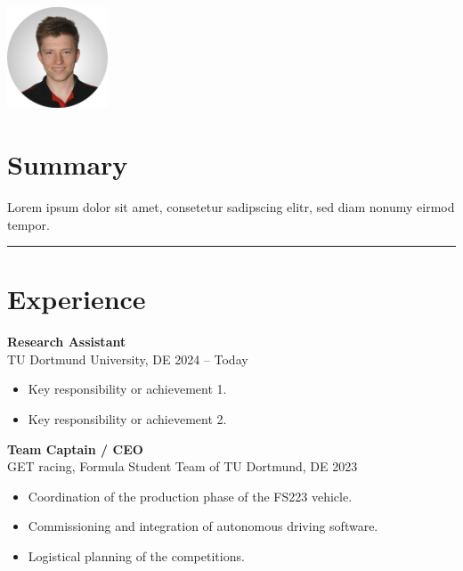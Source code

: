 \documentclass[a4paper,11pt]{article}
\begin{document}
\begin{minipage}[t]{0.3106\textwidth}
    \vspace{-24.62cm}
    \hspace{1.44cm}
    \includegraphics[width=3cm,clip]{profile.png}
\end{minipage}
\hfill
\begin{minipage}[t]{0.65\textwidth}
    \section*{Summary}

    Lorem ipsum dolor sit amet, consetetur sadipscing elitr, sed diam nonumy eirmod tempor.

    \vspace{0.5cm}
    \hrule

    \section*{Experience}
    \textbf{Research Assistant} \\ TU Dortmund University, DE \hfill 2024 -- Today
    \begin{itemize}
        \item Key responsibility or achievement 1.
        \item Key responsibility or achievement 2.
    \end{itemize}

    \vspace{0.2cm}

    \textbf{Team Captain / CEO} \\ GET racing, Formula Student Team of TU Dortmund, DE \hfill 2023
    \begin{itemize}
        \item Coordination of the production phase of the FS223 vehicle.
        \item Commissioning and integration of autonomous driving software.
        \item Logistical planning of the competitions.
    \end{itemize}


\end{minipage}
\end{document}
